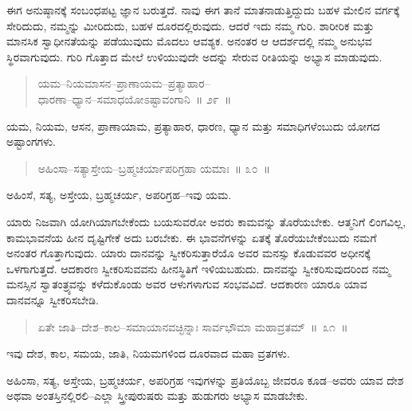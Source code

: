 ಈಗ ಅನುಷ್ಠಾನಕ್ಕೆ ಸಂಬಂಧಪಟ್ಟ ಜ್ಞಾನ ಬರುತ್ತದೆ. ನಾವು ಈಗ ತಾನೆ ಮಾತನಾಡುತ್ತಿದ್ದುದು ಬಹಳ ಮೇಲಿನ ವರ್ಗಕ್ಕೆ ಸೇರಿದುದು, ನಮ್ಮನ್ನು ಮೀರಿದುದು, ಬಹಳ ದೂರದಲ್ಲಿರುವುದು. ಆದರೆ ಇದು ನಮ್ಮ ಗುರಿ. ಶಾರೀರಿಕ ಮತ್ತು ಮಾನಸಿಕ ಸ್ವಾಧೀನತೆಯನ್ನು ಪಡೆಯುವುದು ಮೊದಲು ಆವಶ್ಯಕ. ಅನಂತರ ಆ ಆದರ್ಶದಲ್ಲಿ ನಮ್ಮ ಅನುಭವ ಸ್ಥಿರ\break ವಾಗುವುದು. ಗುರಿ ಗೊತ್ತಾದ ಮೇಲೆ ಉಳಿಯುವುದೇ ಅದನ್ನು ಸೇರುವ ರೀತಿಯನ್ನು ಅಭ್ಯಾಸ ಮಾಡುವುದು. 

\vspace{-0.3cm}

\begin{verse}
ಯಮ–ನಿಯಮಾಸನ–ಪ್ರಾಣಾಯಮ–ಪ್ರತ್ಯಾಹಾರ–\\ಧಾರಣಾ–ಧ್ಯಾನ–ಸಮಾಧಯೋಽಷ್ಟಾವಂಗಾನಿ~॥ ೨೯~॥
\end{verse}

\vspace{-0.3cm}

ಯಮ, ನಿಯಮ, ಆಸನ, ಪ್ರಾಣಾಯಾಮ, ಪ್ರತ್ಯಾಹಾರ, ಧಾರಣ, ಧ್ಯಾನ ಮತ್ತು ಸಮಾಧಿಗಳೆಂಬುದು ಯೋಗದ ಅಷ್ಟಾಂಗಗಳು. 

\vspace{-0.3cm}

\begin{verse}
ಅಹಿಂಸಾ–ಸತ್ಯಾಸ್ತೇಯ–ಬ್ರಹ್ಮಚರ್ಯಾಪರಿಗ್ರಹಾ ಯಮಾಃ~॥ ೩೦~॥
\end{verse}

\vspace{-0.3cm}

ಅಹಿಂಸೆ, ಸತ್ಯ, ಅಸ್ತೇಯ, ಬ್ರಹ್ಮಚರ್ಯ, ಅಪರಿಗ್ರಹ–ಇವು ಯಮ. 

ಯಾರು ನಿಜವಾಗಿ ಯೋಗಿಯಾಗಬೇಕೆಂದು ಬಯಸುವರೋ ಅವರು ಕಾಮವನ್ನು ತೊರೆಯಬೇಕು. ಆತ್ಮನಿಗೆ ಲಿಂಗವಿಲ್ಲ, ಕಾಮಭಾವನೆಯ ಹೀನ ದೃಷ್ಟಿಗೇಕೆ ಅದು ಬರಬೇಕು. ಈ ಭಾವನೆಗಳನ್ನು ಏತಕ್ಕೆ ತೊರೆಯಬೇಕೆಂಬುದು ನಮಗೆ ಅನಂತರ ಗೊತ್ತಾಗುವುದು. ಯಾರು ದಾನವನ್ನು ಸ್ವೀಕರಿಸುತ್ತಾರೆಯೊ ಅವರ ಮನಸ್ಸು ಕೊಡುವವರ ಅಧೀನಕ್ಕೆ ಒಳಗಾಗುತ್ತದೆ. ಆದಕಾರಣ ಸ್ವೀಕರಿಸುವವನು ಹೀನಸ್ಥಿತಿಗೆ ಇಳಿಯಬಹುದು. ದಾನವನ್ನು ಸ್ವೀಕರಿಸುವುದರಿಂದ ನಮ್ಮ ಮನಸ್ಸಿನ ಸ್ವಾತಂತ್ರ್ಯವನ್ನು ಕಳೆದುಕೊಂಡು ಅವರ ಆಳುಗಳಾಗುವ ಸಂಭವವಿದೆ. ಆದಕಾರಣ ಯಾರೂ ಯಾವ ದಾನವನ್ನೂ ಸ್ವೀಕರಿಸಬೇಡಿ. 

\vspace{-0.3cm}

\begin{verse}
ಏತೇ ಜಾತಿ–ದೇಶ–ಕಾಲ–ಸಮಾಯಾನವಚ್ಛಿನ್ನಾಃ ಸಾರ್ವಭೌಮಾ ಮಹಾವ್ರತಮ್​~॥~೩೧~॥
\end{verse}

\vspace{-0.3cm}

ಇವು ದೇಶ, ಕಾಲ, ಸಮಯ, ಜಾತಿ, ನಿಯಮಗಳಿಂದ ದೂರವಾದ ಮಹಾ ವ್ರತಗಳು. 

ಅಹಿಂಸಾ, ಸತ್ಯ, ಅಸ್ತೇಯ, ಬ್ರಹ್ಮಚರ್ಯ, ಅಪರಿಗ್ರಹ ಇವುಗಳನ್ನು ಪ್ರತಿಯೊಬ್ಬ ಜೀವರೂ ಕೂಡ–ಅವರು ಯಾವ ದೇಶ ಅಥವಾ ಅಂತಸ್ತಿನಲ್ಲಿರಲಿ–ಎಲ್ಲಾ ಸ್ತ್ರೀಪುರುಷರು ಮತ್ತು ಹುಡುಗರು ಅಭ್ಯಾಸ ಮಾಡಬೇಕು. 

